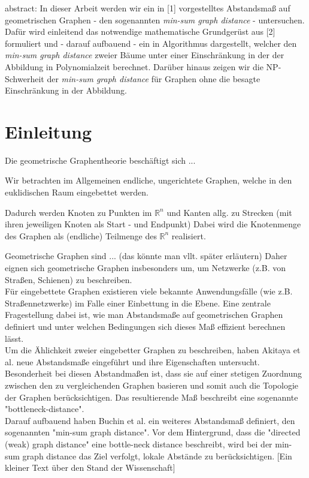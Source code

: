 \documentclass[a4paper, 12pt, twoside]{article}
\theoremstyle{Format1} %
\begin{document}
\newpage
abstract:
In dieser Arbeit werden wir ein in [1] vorgestelltes Abstandsmaß auf geometrischen Graphen - den sogenannten \textit{min-sum graph distance} - untersuchen.
Dafür wird einleitend das notwendige mathematische Grundgerüst aus [2] formuliert und - darauf aufbauend - ein in Algorithmus
dargestellt, welcher den \textit{min-sum graph distance} zweier Bäume unter einer Einschränkung in der der Abbildung in Polynomialzeit berechnet.
Darüber hinaus zeigen wir die NP-Schwerheit der \textit{min-sum graph distance} für Graphen ohne die besagte Einschränkung in der Abbildung.


\newpage
\tableofcontents
\newpage\null\thispagestyle{empty}\newpage %
\section{Einleitung}

Die geometrische Graphentheorie beschäftigt sich ...

Wir betrachten im Allgemeinen endliche, ungerichtete Graphen, welche in den euklidischen Raum eingebettet werden.

Dadurch werden Knoten zu Punkten im $ \mathbb{R}^n $ und Kanten allg. zu Strecken (mit ihren jeweiligen Knoten als Start - und Endpunkt)
Dabei wird die Knotenmenge des Graphen als (endliche) Teilmenge des $ \mathbb{R}^n $ realisiert.

Geometrische Graphen sind ... (das könnte man vllt. später erläutern)
Daher eignen sich geometrische Graphen insbesonders um, um Netzwerke (z.B. von Straßen, Schienen) zu beschreiben.
\\
Für eingebettete Graphen existieren viele bekannte Anwendungsfälle (wie z.B. Straßennetzwerke) im Falle einer Einbettung in die Ebene.
Eine zentrale Fragestellung dabei ist, wie man Abstandsmaße auf geometrischen Graphen definiert und unter welchen Bedingungen sich dieses Maß effizient berechnen lässt.
\\
Um die Ählichkeit zweier eingebetter Graphen zu beschreiben, haben Akitaya et al. \cite{Akitaya} neue Abstandsmaße eingeführt und ihre Eigenschaften untersucht.
\\
Besonderheit bei diesen Abstandmaßen ist, dass sie auf einer stetigen Zuordnung zwischen den zu vergleichenden Graphen basieren und somit auch die Topologie der Graphen berücksichtigen.
Das resultierende Maß beschreibt eine sogenannte "bottleneck-distance".
\\
Darauf aufbauend haben \cite{Buchin} Buchin et al. ein weiteres Abstandsmaß definiert, den sogenannten "min-sum graph distance".
Vor dem Hintergrund, dass die "directed (weak) graph distance" eine bottle-neck distance beschreibt, wird bei der min-sum graph distance das Ziel verfolgt, lokale Abstände zu berücksichtigen.
[Ein kleiner Text über den Stand der Wissenschaft]
\end{document}
